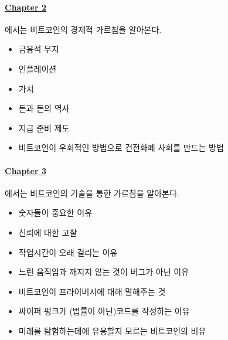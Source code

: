 \paragraph{\hyperref[ch:economics]{Chapter 2}}{에서는 비트코인의 경제적 가르침을 알아본다.
\begin{itemize}
	\item 금융적 무지
	\item 인플레이션
	\item 가치
	\item 돈과 돈의 역사
	\item 지급 준비 제도
	\item 비트코인이 우회적인 방법으로 건전화폐 사회를 만드는 방법
	\end{itemize}}
	
\paragraph{\hyperref[ch:technology]{Chapter 3}}{에서는 비트코인의 기술을 통한 가르침을 알아본다.
\begin{itemize}
	\item 숫자들이 중요한 이유
	\item 신뢰에 대한 고찰
	\item 작업시간이 오래 걸리는 이유
	\item 느린 움직임과 깨지지 않는 것이 버그가 아닌 이유
	\item 비트코인이 프라이버시에 대해 말해주는 것
	\item 싸이퍼 펑크가 (법률이 아닌)코드를 작성하는 이유
	\item 미래를 탐험하는데에 유용할지 모르는 비트코인의 비유
	\end{itemize}}
	

